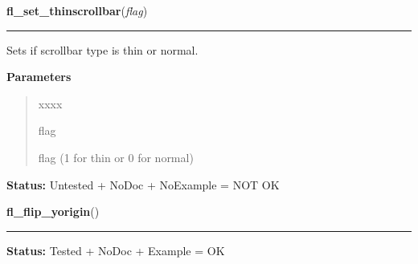     \label{xformslib:library:fl_set_thinscrollbar}

    \vspace{0.5ex}

\hspace{.8\funcindent}\begin{boxedminipage}{\funcwidth}

    \raggedright \textbf{fl\_set\_thinscrollbar}(\textit{flag})

    \vspace{-1.5ex}

    \rule{\textwidth}{0.5\fboxrule}
\setlength{\parskip}{2ex}
    Sets if scrollbar type is thin or normal.

\setlength{\parskip}{1ex}
      \textbf{Parameters}
      \vspace{-1ex}

      \begin{quote}
        \begin{Ventry}{xxxx}

          \item[flag]

          flag (1 for thin or 0 for normal)

        \end{Ventry}

      \end{quote}

\textbf{Status:} Untested + NoDoc + NoExample = NOT OK



    \end{boxedminipage}

    \label{xformslib:library:fl_flip_yorigin}

    \vspace{0.5ex}

\hspace{.8\funcindent}\begin{boxedminipage}{\funcwidth}

    \raggedright \textbf{fl\_flip\_yorigin}()

    \vspace{-1.5ex}

    \rule{\textwidth}{0.5\fboxrule}
\setlength{\parskip}{2ex}
\setlength{\parskip}{1ex}
\textbf{Status:} Tested + NoDoc + Example = OK



    \end{boxedminipage}

